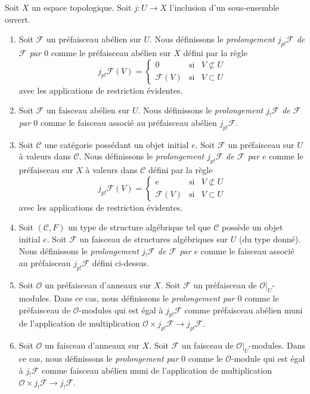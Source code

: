 \begin{definition}
\label{definition-j-shriek-structures}
Soit $X$ un espace topologique.
Soit $j : U \to X$ l'inclusion d'un sous-ensemble ouvert.
\begin{enumerate}
\item Soit $\mathcal{F}$ un préfaisceau abélien sur $U$.
Nous définissons le {\it prolongement $j_{p!}\mathcal{F}$ de $\mathcal{F}$ par $0$}
comme le préfaisceau abélien sur $X$ défini par la règle
$$
j_{p!}\mathcal{F}(V) =
\left\{
\begin{matrix}
0 & \text{si} & V \not \subset U \\
\mathcal{F}(V) & \text{si} & V \subset U
\end{matrix}
\right.
$$
avec les applications de restriction évidentes.
\item Soit $\mathcal{F}$ un faisceau abélien sur $U$. Nous définissons
le {\it prolongement $j_!\mathcal{F}$ de $\mathcal{F}$ par $0$}
comme le faisceau associé au préfaisceau abélien $j_{p!}\mathcal{F}$.
\item Soit $\mathcal{C}$ une catégorie possédant un objet initial $e$.
Soit $\mathcal{F}$ un préfaisceau sur $U$ à valeurs dans $\mathcal{C}$.
Nous définissons le {\it prolongement $j_{p!}\mathcal{F}$ de $\mathcal{F}$ par $e$}
comme le préfaisceau sur $X$ à valeurs dans $\mathcal{C}$ défini par la
règle
$$
j_{p!}\mathcal{F}(V) =
\left\{
\begin{matrix}
e & \text{si} & V \not \subset U \\
\mathcal{F}(V) & \text{si} & V \subset U
\end{matrix}
\right.
$$
avec les applications de restriction évidentes.
\item Soit $(\mathcal{C}, F)$ un type de structure algébrique
tel que $\mathcal{C}$ possède un objet initial $e$.
Soit $\mathcal{F}$ un faisceau de structures algébriques sur $U$
(du type donné). Nous définissons le
{\it prolongement $j_!\mathcal{F}$ de $\mathcal{F}$ par $e$}
comme le faisceau associé au préfaisceau $j_{p!}\mathcal{F}$
défini ci-dessus.
\item Soit $\mathcal{O}$ un préfaisceau d'anneaux sur $X$.
Soit $\mathcal{F}$ un préfaisceau de $\mathcal{O}|_U$-modules.
Dans ce cas, nous définissons le {\it prolongement par $0$}
comme le préfaisceau de $\mathcal{O}$-modules qui est égal à
$j_{p!}\mathcal{F}$ comme préfaisceau abélien muni de
l'application de multiplication
$\mathcal{O} \times j_{p!}\mathcal{F} \to j_{p!}\mathcal{F}$.
\item Soit $\mathcal{O}$ un faisceau d'anneaux sur $X$.
Soit $\mathcal{F}$ un faisceau de $\mathcal{O}|_U$-modules.
Dans ce cas, nous définissons le {\it prolongement par $0$}
comme le $\mathcal{O}$-module qui est égal à
$j_!\mathcal{F}$ comme faisceau abélien muni de
l'application de multiplication $\mathcal{O} \times j_!\mathcal{F} \to j_!\mathcal{F}$.
\end{enumerate}
\end{definition}

